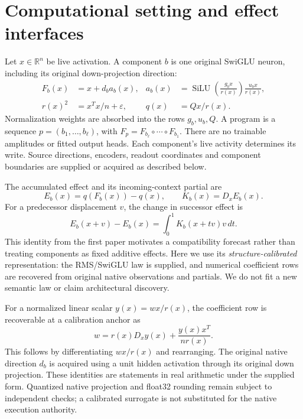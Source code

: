 \documentclass[11pt]{article}
\newcommand{\R}{\mathbb{R}}
\newcommand{\silu}{\operatorname{SiLU}}
\newcommand{\eps}{\varepsilon}
\begin{document}
\section{Computational setting and effect interfaces}
\label{sec:setting}
Let $x\in\R^n$ be live activation. A component $b$ is one original SwiGLU neuron,
including its original down-projection direction:
\begin{align}
 F_b(x)&=x+d_b a_b(x), &
 a_b(x)&=\silu\!\left(\frac{g_bx}{r(x)}\right)
                    \frac{u_bx}{r(x)},\label{eq:atom}\\
 r(x)^2&=x^Tx/n+\eps, & q(x)&=Qx/r(x).\label{eq:readout}
\end{align}
Normalization weights are absorbed into the rows $g_b,u_b,Q$. A program is a
sequence $p=(b_1,\ldots,b_\ell)$, with $F_p=F_{b_\ell}\circ\cdots\circ F_{b_1}$.
There are no trainable amplitudes or fitted output heads. Each component's live
activity determines its write. Source directions, encoders, readout coordinates
and component boundaries are supplied or acquired as described below.

The accumulated effect and its incoming-context partial are
\begin{equation}
 E_b(x)=q(F_b(x))-q(x),\qquad K_b(x)=D_xE_b(x).
\end{equation}
For a predecessor displacement $v$, the change in successor effect is
\begin{equation}
 E_b(x+v)-E_b(x)=\int_0^1K_b(x+tv)v\,dt.
\end{equation}
This identity from the first paper motivates a compatibility forecast rather
than treating components as fixed additive effects. Here we use its
\emph{structure-calibrated} representation: the RMS/SwiGLU law is supplied,
and numerical coefficient rows are recovered from original native observations
and partials. We do not fit a new semantic law or claim architectural discovery.

For a normalized linear scalar $y(x)=wx/r(x)$, the coefficient row is recoverable
at a calibration anchor as
\begin{equation}
 w=r(x)D_xy(x)+\frac{y(x)x^T}{nr(x)}.\label{eq:calibration}
\end{equation}
This follows by differentiating $wx/r(x)$ and rearranging. The original native
direction $d_b$ is acquired using a unit hidden activation through its original
down projection. These identities are statements in real arithmetic under the
supplied form. Quantized native projection and float32 rounding remain subject
to independent checks; a calibrated surrogate is not substituted for the native
execution authority.
\end{document}
